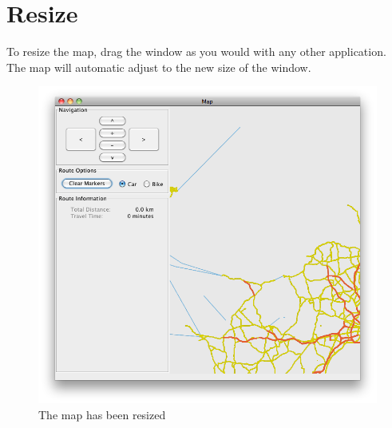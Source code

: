 \section{Resize}
\label{MAN-RS}
To resize the map, drag the window as you would with any other application. The
map will automatic adjust to the new size of the window.
\begin{figure}[h!]
\centering
\includegraphics[width=1\linewidth]{images/man-resize.png}
\caption{The map has been resized}
\label{man-radio}
\end{figure}